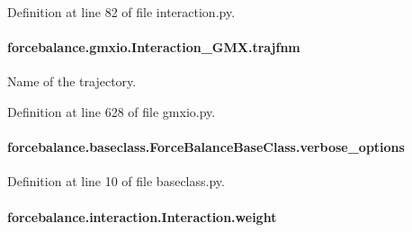 Definition at line 82 of file interaction.\-py.

\hypertarget{classforcebalance_1_1gmxio_1_1Interaction__GMX_a6509ba9c6cb4618812e493c2715a64f3}{
\paragraph[{trajfnm}]{\setlength{\rightskip}{0pt plus 5cm}forcebalance.\-gmxio.\-Interaction\-\_\-\-G\-M\-X.\-trajfnm}}\label{classforcebalance_1_1gmxio_1_1Interaction__GMX_a6509ba9c6cb4618812e493c2715a64f3}


Name of the trajectory. 



Definition at line 628 of file gmxio.\-py.

\hypertarget{classforcebalance_1_1baseclass_1_1ForceBalanceBaseClass_a8088e1e20cbd6bc175fb9c9fe9fa0f18}{
\paragraph[{verbose\-\_\-options}]{\setlength{\rightskip}{0pt plus 5cm}forcebalance.\-baseclass.\-Force\-Balance\-Base\-Class.\-verbose\-\_\-options\hspace{0.3cm}{\ttfamily [inherited]}}}\label{classforcebalance_1_1baseclass_1_1ForceBalanceBaseClass_a8088e1e20cbd6bc175fb9c9fe9fa0f18}


Definition at line 10 of file baseclass.\-py.

\hypertarget{classforcebalance_1_1interaction_1_1Interaction_a68a6e43e48ec75f375fb987e177126a9}{
\paragraph[{weight}]{\setlength{\rightskip}{0pt plus 5cm}forcebalance.\-interaction.\-Interaction.\-weight\hspace{0.3cm}{\ttfamily [inherited]}}}\label{classforcebalance_1_1interaction_1_1Interaction_a68a6e43e48ec75f375fb987e177126a9}


